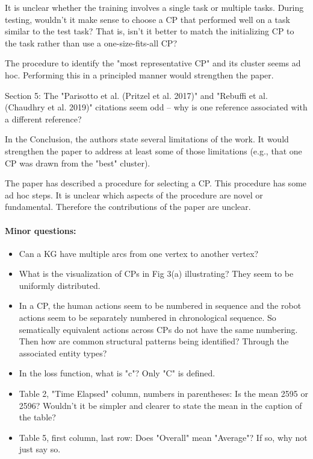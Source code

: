 \documentclass[letterpaper]{article} %
\begin{document}
It is unclear whether the training involves a single task or multiple tasks. During testing, wouldn't it make sense to choose a CP that performed well on a task similar to the test task? That is, isn't it better to match the initializing CP to the task rather than use a one-size-fits-all CP?

The procedure to identify the "most representative CP" and its cluster seems ad hoc. Performing this in a principled manner would strengthen the paper.

Section 5: The "Parisotto et al. (Pritzel et al. 2017)" and "Rebuffi et al. (Chaudhry et al. 2019)" citations seem odd -- why is one reference associated with a different reference?

In the Conclusion, the authors state several limitations of the work. It would strengthen the paper to address at least some of those limitations (e.g., that one CP was drawn from the "best" cluster).

The paper has described a procedure for selecting a CP. This procedure has some ad hoc steps. It is unclear which aspects of the procedure are novel or fundamental. Therefore the contributions of the paper are unclear.

\paragraph{Minor questions:}
\begin{itemize}
  \item Can a KG have multiple arcs from one vertex to another vertex?
  \item What is the visualization of CPs in Fig 3(a) illustrating? They seem to be uniformly distributed.
  \item In a CP, the human actions seem to be numbered in sequence and the robot actions seem to be separately numbered in chronological sequence. So sematically equivalent actions across CPs do not have the same numbering. Then how are common structural patterns being identified? Through the associated entity types?
  \item In the loss function, what is "c"? Only "C" is defined.
  \item Table 2, "Time Elapsed" column, numbers in parentheses: Is the mean 2595 or 2596? Wouldn't it be simpler and clearer to state the mean in the caption of the table?
  \item Table 5, first column, last row: Does "Overall" mean "Average"? If so, why not just say so.
\end{itemize}
\end{document}
